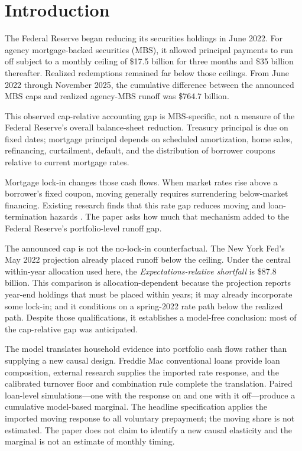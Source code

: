 
\section{Introduction}\label{sec:intro}\label{fn:manifest}

The Federal Reserve began reducing its securities holdings in June 2022. For agency mortgage-backed securities (MBS), it allowed principal payments to run off subject to a monthly ceiling of \$17.5 billion for three months and \$35 billion thereafter. Realized redemptions remained far below those ceilings. From June 2022 through November 2025, the cumulative difference between the announced MBS caps and realized agency-MBS runoff was \$764.7 billion.

This observed cap-relative accounting gap is MBS-specific, not a measure of the Federal Reserve's overall balance-sheet reduction. Treasury principal is due on fixed dates; mortgage principal depends on scheduled amortization, home sales, refinancing, curtailment, default, and the distribution of borrower coupons relative to current mortgage rates.

Mortgage lock-in changes those cash flows. When market rates rise above a borrower's fixed coupon, moving generally requires surrendering below-market financing. Existing research finds that this rate gap reduces moving and loan-termination hazards \citep{berger2021,eichenbaum2022,liebersohn2024,batzer2024}. The paper asks how much that mechanism added to the Federal Reserve's portfolio-level runoff gap.

The announced cap is not the no-lock-in counterfactual. The New York Fed's May 2022 projection already placed runoff below the ceiling. Under the central within-year allocation used here, the \emph{Expectations-relative shortfall} is \$87.8 billion. This comparison is allocation-dependent because the projection reports year-end holdings that must be placed within years; it may already incorporate some lock-in; and it conditions on a spring-2022 rate path below the realized path. Despite those qualifications, it establishes a model-free conclusion: most of the cap-relative gap was anticipated.

The model translates household evidence into portfolio cash flows rather than supplying a new causal design. Freddie Mac conventional loans provide loan composition, external research supplies the imported rate response, and the calibrated turnover floor and combination rule complete the translation. Paired loan-level simulations---one with the response on and one with it off---produce a cumulative model-based marginal. The headline specification applies the imported moving response to all voluntary prepayment; the moving share is not estimated. The paper does not claim to identify a new causal elasticity and the marginal is not an estimate of monthly timing.

